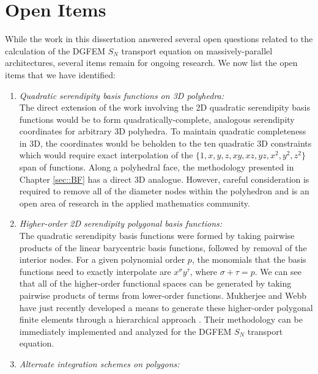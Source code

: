 \section{Open Items}
\label{sec::Conclusions_Open_Items}

While the work in this dissertation answered several open questions related to the calculation of the DGFEM $S_N$ transport equation on massively-parallel architectures, several items remain for ongoing research. We now list the open items that we have identified:

\begin{enumerate}
\item {\em Quadratic serendipity basis functions on 3D polyhedra:} \\
The direct extension of the work involving the 2D quadratic serendipity basis functions would be to form quadratically-complete, analogous serendipity coordinates for arbitrary 3D polyhedra. To maintain quadratic completeness in 3D, the coordinates would be beholden to the ten quadratic 3D constraints which would require exact interpolation of the $\{ 1,x,y,z,xy,xz,yz,x^2,y^2,z^2 \}$ span of functions. Along a polyhedral face, the methodology presented in Chapter \ref{sec::BF} has a direct 3D analogue. However, careful consideration is required to remove all of the diameter nodes within the polyhedron and is an open area of research in the applied mathematics community.
\item {\em Higher-order 2D serendipity polygonal basis functions:} \\
The quadratic serendipity basis functions were formed by taking pairwise products of the linear barycentric basis functions, followed by removal of the interior nodes. For a given polynomial order $p$, the monomials that the basis functions need to exactly interpolate are $x^\sigma y^\tau$, where $\sigma + \tau = p$. We can see that all of the higher-order functional spaces can be generated by taking pairwise products of terms from lower-order functions. Mukherjee and Webb have just recently developed a means to generate these higher-order polygonal finite elements through a hierarchical approach \cite{mukherjee2015hierarchical}. Their methodology can be immediately implemented and analyzed for the DGFEM $S_N$ transport equation. 
\item {\em Alternate integration schemes on polygons:} \\

\end{enumerate}
